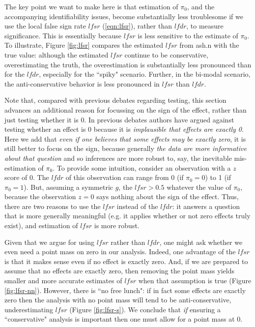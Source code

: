 \documentclass[11pt]{article}
\def\lfdr{\textit{lfdr}}
\def\lfsr{\textit{lfsr}}
\begin{document}
The key point we want to make here is that estimation of $\pi_0$, and the accompanying identifiability issues,
 become substantially less troublesome if we use the local false sign rate $\lfsr$ (\ref{eqn:lfsr}), rather than $\lfdr$, to measure significance. 
 This is essentially because $\lfsr$ is less sensitive to the estimate of $\pi_0$.
To illustrate, Figure \ref{fig:lfsr} compares the estimated $\lfsr$ from ash.n with the true value: although the estimated $\lfsr$ continue to
be conservative, overestimating the truth, the overestimation is substantially less pronounced than for the $\lfdr$, especially for
the ``spiky" scenario. Further, in the bi-modal scenario, the anti-conservative behavior is less pronounced in $\lfsr$ than $\lfdr$.

Note that, compared with previous debates regarding testing, 
this section advances an additional reason for focussing on the sign of the effect, rather than just testing whether it is 0. 
In previous debates authors have argued against testing whether an effect is 0
because it is {\it implausible that effects are exactly 0}. Here we add that {\it even if one believes
that some effects may be exactly zero}, it is still better to focus on the sign, because generally {\it the data are more informative about that question}
and so inferences are more robust to, say, the inevitable mis-estimation of $\pi_0$.
To provide some intuition, consider an observation with a $z$ score of 0. The $\lfdr$ of this observation can range from 0 (if $\pi_0=0$)
to 1 (if $\pi_0=1$). But, assuming a symmetric $g$, the $\lfsr>0.5$ whatever the value of $\pi_0$, because the observation $z=0$ says
nothing about the sign of the effect.
Thus, there are two reasons to use the $\lfsr$ instead of the $\lfdr$: it answers a question that is more generally meaningful (e.g. it applies
whether or not zero effects truly exist),  and estimation of $\lfsr$ is more robust. 
 
Given that we argue for using $\lfsr$ rather than $\lfdr$, one might ask whether we even need a point mass on zero in our analysis.
Indeed, one advantage of the $\lfsr$ is that it makes sense even if no effect is exactly zero. And, 
if we are prepared to assume that no effects are exactly zero, then removing the point mass 
yields smaller and more accurate estimates of $\lfsr$ when that assumption is true (Figure \ref{fig:lfsr-nn}). 
However, there is ``no free lunch":  if in fact some effects are exactly zero
then the analysis with no point mass will tend to be anti-conservative, underestimating $\lfsr$ (Figure \ref{fig:lfsr-s}). 
We conclude that {\it if} ensuring a ``conservative" analysis is important then one must allow for a point mass at 0. 
\end{document}

